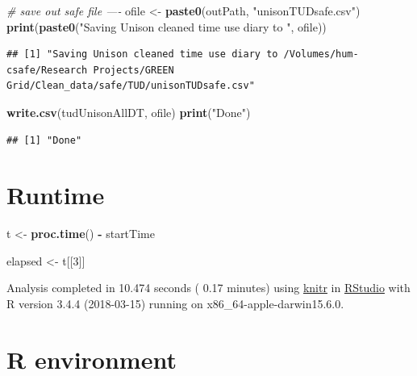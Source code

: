 \documentclass[]{article}
\newenvironment{Shaded}{\begin{snugshade}}{\end{snugshade}}
\newcommand{\KeywordTok}[1]{\textcolor[rgb]{0.13,0.29,0.53}{\textbf{#1}}}
\newcommand{\DecValTok}[1]{\textcolor[rgb]{0.00,0.00,0.81}{#1}}
\newcommand{\StringTok}[1]{\textcolor[rgb]{0.31,0.60,0.02}{#1}}
\newcommand{\CommentTok}[1]{\textcolor[rgb]{0.56,0.35,0.01}{\textit{#1}}}
\newcommand{\OperatorTok}[1]{\textcolor[rgb]{0.81,0.36,0.00}{\textbf{#1}}}
\newcommand{\NormalTok}[1]{#1}
\begin{document}
\begin{Shaded}
\begin{Highlighting}[]
\CommentTok{# save out safe file ----}
\NormalTok{ofile <-}\StringTok{ }\KeywordTok{paste0}\NormalTok{(outPath, }\StringTok{"unisonTUDsafe.csv"}\NormalTok{)}
\KeywordTok{print}\NormalTok{(}\KeywordTok{paste0}\NormalTok{(}\StringTok{"Saving Unison cleaned time use diary to "}\NormalTok{, ofile))}
\end{Highlighting}
\end{Shaded}

\begin{verbatim}
## [1] "Saving Unison cleaned time use diary to /Volumes/hum-csafe/Research Projects/GREEN Grid/Clean_data/safe/TUD/unisonTUDsafe.csv"
\end{verbatim}

\begin{Shaded}
\begin{Highlighting}[]
\KeywordTok{write.csv}\NormalTok{(tudUnisonAllDT, ofile)}
\KeywordTok{print}\NormalTok{(}\StringTok{"Done"}\NormalTok{)}
\end{Highlighting}
\end{Shaded}

\begin{verbatim}
## [1] "Done"
\end{verbatim}

\section{Runtime}\label{runtime}

\begin{Shaded}
\begin{Highlighting}[]
\NormalTok{t <-}\StringTok{ }\KeywordTok{proc.time}\NormalTok{() }\OperatorTok{-}\StringTok{ }\NormalTok{startTime}

\NormalTok{elapsed <-}\StringTok{ }\NormalTok{t[[}\DecValTok{3}\NormalTok{]]}
\end{Highlighting}
\end{Shaded}

Analysis completed in 10.474 seconds ( 0.17 minutes) using
\href{https://cran.r-project.org/package=knitr}{knitr} in
\href{http://www.rstudio.com}{RStudio} with R version 3.4.4 (2018-03-15)
running on x86\_64-apple-darwin15.6.0.

\section{R environment}\label{r-environment}
\end{document}
